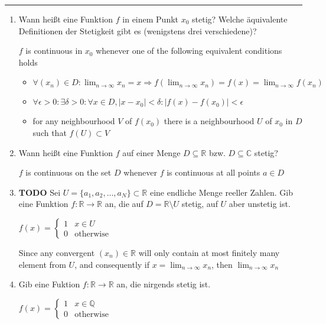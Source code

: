 \documentclass[11pt]{article}
\begin{document}
\Large




\medskip\hrule
\begin{enumerate}

\item Wann heißt eine Funktion $f$ in einem Punkt $x_0$ stetig? Welche äquivalente Definitionen der Stetigkeit gibt es (wenigstens drei verschiedene)?

$f$ is continuous in $x_0$ whenever one of the following equivalent conditions holds
\begin{itemize}
    \item $\forall (x_n) \in D\colon \lim_{n\to\infty}{x_n} = x \Rightarrow f(\lim_{n\to\infty}{x_n}) = f(x) = \lim_{n\to\infty}{f(x_n)}$
    \item $\forall \epsilon > 0\colon \exists \delta > 0\colon \forall x \in D, | x - x_0| < \delta\colon |f(x) - f(x_0)| < \epsilon$
    \item for any neighbourhood $V$ of $f(x_0)$ there is a neighbourhood $U$ of $x_0$ in $D$ such that $f(U) \subset V$
\end{itemize}

\item Wann heißt eine Funktion $f$ auf einer Menge $D \subseteq \mathbb{R}$ bzw. $D \subseteq \mathbb{C}$ stetig?

$f$ is continuous on the set $D$ whenever $f$ is continuous at all points $a \in D$

\item \textbf{TODO} Sei $U = \{a_1, a_2, \dots, a_N \} \subset \mathbb{R}$ eine endliche Menge reeller Zahlen. Gib eine Funktion
$f\colon \mathbb{R} \to \mathbb{R}$ an, die auf $D = \mathbb{R} \setminus U$ stetig, auf $U$ aber unstetig ist.

$f(x) = \begin{cases}
    1& x \in U\\
    0&\text{otherwise}
\end{cases}$

Since any convergent $(x_n) \in \mathbb{R}$ will only contain at most finitely many element from $U$, and consequently if $x = \lim_{n \to \infty} x_n$, then $\lim_{n \to \infty} x_n$

\item Gib eine Fuktion $f\colon \mathbb{R} \to \mathbb{R}$ an, die nirgends stetig ist.

$f(x) = \begin{cases}
    1&x\in \mathbb{Q}\\
    0&\text{otherwise}
\end{cases}$


\end{enumerate}
\end{document}
